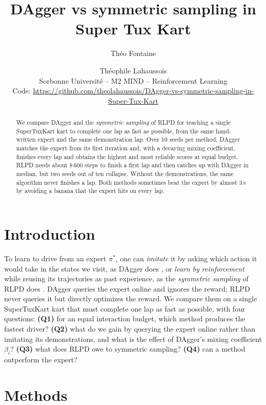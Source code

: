 \documentclass[10pt,a4paper,english]{article}
\title{DAgger vs symmetric sampling in Super Tux Kart}
\author{Théo Fontaine \and Théophile Lahaussois\\[0.3em]
  \small Sorbonne Université -- M2 MIND -- Reinforcement Learning\\
  \small Code: \url{https://github.com/theolahaussois/DAgger-vs-symmetric-sampling-in-Super-Tux-Kart}}
\date{}
\newcommand{\piexp}{\pi^{*}}
\begin{document}
\maketitle

\begin{abstract}
We compare DAgger and the \emph{symmetric sampling} of RLPD for teaching a single SuperTuxKart kart to complete one lap as fast as possible, from the same hand-written expert and the same demonstration lap. Over 10 seeds per method, DAgger matches the expert from its first iteration and, with a decaying mixing coefficient, finishes every lap and obtains the highest and most reliable scores at equal budget. RLPD needs about 8\,600 steps to finish a first lap and then catches up with DAgger in median, but two seeds out of ten collapse. Without the demonstrations, the same algorithm never finishes a lap. Both methods sometimes beat the expert by almost 3\,s by avoiding a banana that the expert hits on every lap.
\end{abstract}

\section{Introduction}
\label{sec-intro}

To learn to drive from an expert $\piexp$, one can \emph{imitate} it by asking which action it would take in the states we visit, as DAgger does \citep{ross2011dagger}, or \emph{learn by reinforcement} while reusing its trajectories as past experience, as the \emph{symmetric sampling} of RLPD does \citep{ball2023rlpd}. DAgger queries the expert online and ignores the reward; RLPD never queries it but directly optimizes the reward. We compare them on a single SuperTuxKart kart that must complete one lap as fast as possible, with four questions: \textbf{(Q1)} for an equal interaction budget, which method produces the fastest driver? \textbf{(Q2)} what do we gain by querying the expert online rather than imitating its demonstrations, and what is the effect of DAgger's mixing coefficient $\beta_i$? \textbf{(Q3)} what does RLPD owe to symmetric sampling? \textbf{(Q4)} can a method outperform the expert?

\section{Methods}
\label{sec-methods}
\end{document}
